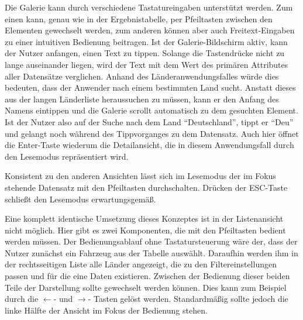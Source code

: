 Die Galerie kann durch verschiedene Tastatureingaben unterstützt werden. Zum einen kann, genau wie in der Ergebnistabelle, per Pfeiltasten zwischen den Elementen gewechselt werden, zum anderen können aber auch Freitext-Eingaben zu einer intuitiven Bedienung beitragen. Ist der Galerie-Bildschirm aktiv, kann der Nutzer anfangen, einen Text zu tippen. Solange die Tastendrücke nicht zu lange auseinander liegen, wird der Text mit dem Wert des primären Attributes aller Datensätze verglichen. Anhand des Länderanwendungsfalles würde dies bedeuten, dass der Anwender nach einem bestimmten Land sucht. Anstatt dieses aus der langen Länderliste heraussuchen zu müssen, kann er den Anfang des Namens eintippen und die Galerie scrollt automatisch zu dem gesuchten Element. Ist der Nutzer also auf der Suche nach dem Land \enquote{Deutschland}, tippt er \enquote{Deu} und gelangt noch während des Tippvorganges zu dem Datensatz. Auch hier öffnet die Enter-Taste wiederum die Detailansicht, die in diesem Anwendungsfall durch den Lesemodus repräsentiert wird.\par
Konsistent zu den anderen Ansichten lässt sich im Lesemodus der im Fokus stehende Datensatz mit den Pfeiltasten durchschalten. Drücken der ESC-Taste schließt den Lesemodus erwartungsgemäß. \par
Eine komplett identische Umsetzung dieses Konzeptes ist in der Listenansicht nicht möglich. Hier gibt es zwei Komponenten, die mit den Pfeiltasten bedient werden müssen. Der Bedienungsablauf ohne Tastatursteuerung wäre der, dass der Nutzer zunächst ein Fahrzeug aus der Tabelle auswählt. Daraufhin werden ihm in der rechtsseitigen Liste alle Länder angezeigt, die zu den Filtereinstellungen passen und für die eine Daten existieren. Zwischen der Bedienung dieser beiden Teile der Darstellung sollte gewechselt werden können. Dies kann zum Beispiel durch die $\leftarrow$- und $\rightarrow$- Tasten gelöst werden. Standardmäßig sollte jedoch die linke Hälfte der Ansicht im Fokus der Bedienung stehen.\par
